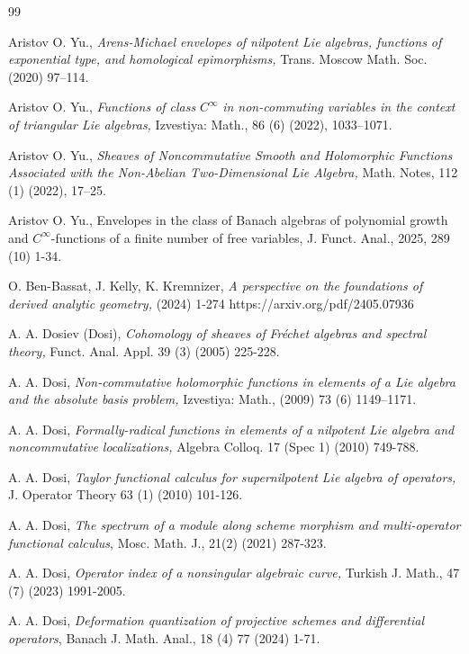 \documentclass[12pt]{amsart}%
\theoremstyle{plain}
\numberwithin{equation}{section}
\numberwithin{equation}{section}
\numberwithin{theorem}{section}
\numberwithin{lemma}{section}
\numberwithin{remark}{section}
\numberwithin{example}{section}
\numberwithin{proposition}{section}
\numberwithin{definition}{section}
\numberwithin{corollary}{section}
\begin{document}
\begin{thebibliography}{99}                                                                                               %


Aristov O. Yu., \textit{Arens-Michael envelopes of nilpotent
Lie algebras, functions of exponential type, and homological epimorphisms,}
Trans. Moscow Math. Soc. (2020) 97--114.

Aristov O. Yu., \textit{Functions of class }$C^{\infty}%
$\textit{ in non-commuting variables in the context of triangular Lie
algebras, }Izvestiya: Math., 86 (6) (2022), 1033--1071.

Aristov O. Yu., \textit{Sheaves of Noncommutative Smooth and
Holomorphic Functions Associated with the Non-Abelian Two-Dimensional Lie
Algebra,} Math. Notes, 112 (1) (2022), 17--25.

Aristov O. Yu., Envelopes in the class of Banach algebras of
polynomial growth and $C^{\infty}$-functions of a finite number of free
variables, J. Funct. Anal., 2025, 289 (10) 1-34.

O. Ben-Bassat, J. Kelly, K. Kremnizer, \textit{A perspective on
the foundations of derived analytic geometry, }(2024) 1-274 https://arxiv.org/pdf/2405.07936

A. A. Dosiev (Dosi), \textit{Cohomology of sheaves of}
\textit{Fr\'{e}chet algebras and spectral theory, }Funct. Anal. Appl. 39 (3)
(2005) 225-228.

A. A. Dosi,\textit{ Non-commutative holomorphic functions in
elements of a Lie algebra and the absolute basis problem,} Izvestiya: Math.,
(2009) 73 (6) 1149--1171.

A. A. Dosi, \textit{Formally-radical functions in elements of
a nilpotent Lie algebra and noncommutative localizations, }Algebra Colloq. 17
(Spec 1) (2010) 749-788.

A. A. Dosi, \textit{Taylor functional calculus for
supernilpotent Lie algebra of operators,} J. Operator Theory 63 (1) (2010) 101-126.

A. A. Dosi, \textit{The spectrum of a module along scheme
morphism and multi-operator functional calculus}, Mosc. Math. J., 21(2) (2021) 287-323.

A. A. Dosi, \textit{Operator index of a nonsingular
algebraic curve, }Turkish J. Math., 47 (7) (2023) 1991-2005.

A. A. Dosi, \textit{Deformation quantization of
projective schemes and differential operators}, Banach J. Math. Anal., 18 (4)
77 (2024) 1-71.


\end{thebibliography}
\end{document}
